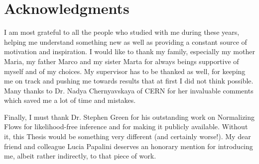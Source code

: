 
\begingroup
\let\clearpage\relax
\let\cleardoublepage\relax
\let\cleardoublepage\relax
\chapter*{Acknowledgments}
I am most grateful to all the people who studied with me during these years, helping me understand something new as well as providing a constant source of motivation and inspiration.
I would like to thank my family, especially my mother Maria, my father Marco and my sister Marta for always beings supportive of myself and of my choices.
My supervisor has to be thanked as well, for keeping me on track and pushing me towards results that at first I did not think possible. Many thanks to Dr. Nadya Chernyavskaya of CERN for her invaluable comments which saved me a lot of time and mistakes.

Finally, I must thank Dr. Stephen Green for his outstanding work on Normalizing Flows for likelihood-free inference and for making it publicly available. Without it, this Thesis would be something very different (and certainly worse!). My dear friend and colleague Lucia Papalini deserves an honorary mention for introducing me, albeit rather indirectly, to that piece of work.


\endgroup
